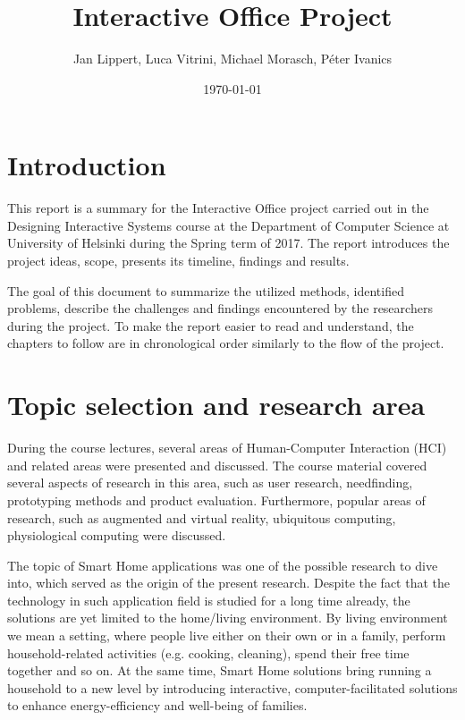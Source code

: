 \documentclass[english]{tktltiki}
\begin{document}
\onehalfspacing

\title{Interactive Office Project}
\author{Jan Lippert, Luca Vitrini, Michael Morasch, Péter Ivanics}
\date{\today}

\maketitle

\mytableofcontents

\section{Introduction}

This report is a summary for the Interactive Office project carried out in the Designing Interactive Systems course at the Department of Computer Science at University of Helsinki during the Spring term of 2017. The report introduces the project ideas, scope, presents its timeline, findings and results.

The goal of this document to summarize the utilized methods, identified problems, describe the challenges and findings encountered by the researchers during the project. To make the report easier to read and understand, the chapters to follow are in chronological order similarly to the flow of the project.

\section{Topic selection and research area}
During the course lectures, several areas of Human-Computer Interaction (HCI) and related areas were presented and discussed. The course material covered several aspects of research in this area, such as user research, needfinding, prototyping methods and product evaluation. Furthermore, popular areas of research, such as augmented and virtual reality, ubiquitous computing, physiological computing were discussed. 

The topic of Smart Home applications was one of the possible research to dive into, which served as the origin of the present research. Despite the fact that the technology in such application field is studied for a long time already, the solutions are yet limited to the home/living environment. By living environment we mean a setting, where people live either on their own or in a family, perform household-related activities (e.g. cooking, cleaning), spend their free time together and so on. At the same time, Smart Home solutions bring running a household to a new level by introducing interactive, computer-facilitated solutions to enhance energy-efficiency and well-being of families. 
\end{document}
